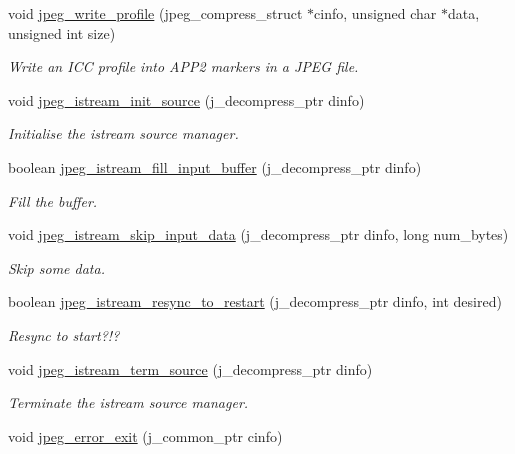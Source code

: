 \begin{DoxyCompactItemize}
void \hyperlink{namespace_photo_finish_a0437f142c40159470e827e79c20f6d59}{jpeg\+\_\+write\+\_\+profile} (jpeg\+\_\+compress\+\_\+struct $\ast$cinfo, unsigned char $\ast$data, unsigned int size)
\begin{DoxyCompactList}\small\item\em Write an I\+CC profile into A\+P\+P2 markers in a J\+P\+EG file. \end{DoxyCompactList}\item 
void \hyperlink{namespace_photo_finish_a3c02a5bc61e291f156e10ebbb5f544d7}{jpeg\+\_\+istream\+\_\+init\+\_\+source} (j\+\_\+decompress\+\_\+ptr dinfo)
\begin{DoxyCompactList}\small\item\em Initialise the istream source manager. \end{DoxyCompactList}\item 
boolean \hyperlink{namespace_photo_finish_a414435f894edeafcef9bb6f39572ecf8}{jpeg\+\_\+istream\+\_\+fill\+\_\+input\+\_\+buffer} (j\+\_\+decompress\+\_\+ptr dinfo)
\begin{DoxyCompactList}\small\item\em Fill the buffer. \end{DoxyCompactList}\item 
void \hyperlink{namespace_photo_finish_a7662e3a9bb30f7ca698a21e4c092da3c}{jpeg\+\_\+istream\+\_\+skip\+\_\+input\+\_\+data} (j\+\_\+decompress\+\_\+ptr dinfo, long num\+\_\+bytes)
\begin{DoxyCompactList}\small\item\em Skip some data. \end{DoxyCompactList}\item 
boolean \hyperlink{namespace_photo_finish_a0a64252810bcf2b15205488328e3e061}{jpeg\+\_\+istream\+\_\+resync\+\_\+to\+\_\+restart} (j\+\_\+decompress\+\_\+ptr dinfo, int desired)
\begin{DoxyCompactList}\small\item\em Resync to start?!? \end{DoxyCompactList}\item 
void \hyperlink{namespace_photo_finish_a3e8433bb81cdaea426e1c9dcf492277f}{jpeg\+\_\+istream\+\_\+term\+\_\+source} (j\+\_\+decompress\+\_\+ptr dinfo)
\begin{DoxyCompactList}\small\item\em Terminate the istream source manager. \end{DoxyCompactList}\item 
void \hyperlink{namespace_photo_finish_a92f9ac89e447e66cf199bd90d683f5f0}{jpeg\+\_\+error\+\_\+exit} (j\+\_\+common\+\_\+ptr cinfo)

\end{DoxyCompactItemize}
